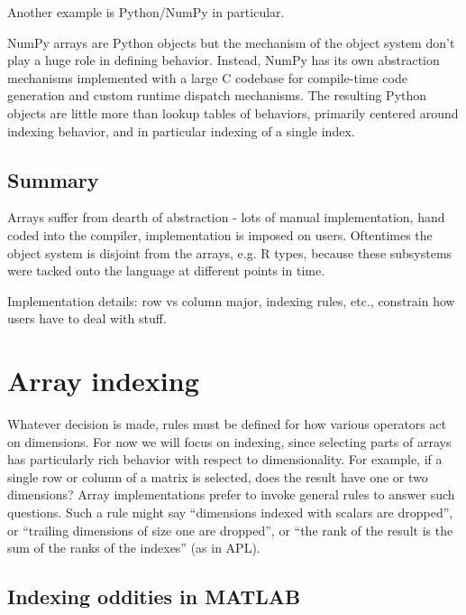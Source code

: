 \documentclass[preprint]{sigplanconf}
\begin{document}
\begin{enumerate}
Another example is Python/NumPy in particular.

NumPy arrays are Python objects but the mechanism of the object system don't
play a huge role in defining behavior. Instead, NumPy has its own abstraction
mechanisms implemented with a large C codebase for compile-time code
generation and custom runtime dispatch mechanisms. The resulting Python
objects are little more than lookup tables of behaviors, primarily centered
around indexing behavior, and in particular indexing of a single index.


\end{enumerate}

\subsection{Summary}

Arrays suffer from dearth of abstraction - lots of manual implementation, hand
coded into the compiler, implementation is imposed on users. Oftentimes the
object system is disjoint from the arrays, e.g. R types, because these
subsystems were tacked onto the language at different points in time.

Implementation details: row vs column major, indexing rules, etc., constrain
how users have to deal with stuff.

\section{Array indexing}

Whatever decision is made, rules must be defined for how various operators act
on dimensions. For now we will focus on indexing, since selecting parts of
arrays has particularly rich behavior with respect to dimensionality. For
example, if a single row or column of a matrix is selected, does the result
have one or two dimensions? Array implementations prefer to invoke general
rules to answer such questions. Such a rule might say ``dimensions indexed
with scalars are dropped'', or ``trailing dimensions of size one are
dropped'', or ``the rank of the result is the sum of the ranks of the
indexes'' (as in APL).


\subsection{Indexing oddities in MATLAB}
\end{document}
